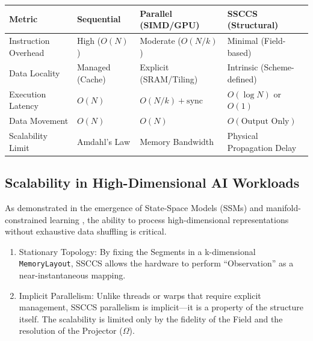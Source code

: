 \documentclass[
  a4paper,
  DIV=11,
  numbers=noendperiod]{scrartcl}
\providecommand{\tightlist}{%
  \setlength{\itemsep}{0pt}\setlength{\parskip}{0pt}}
\begin{document}
\begin{longtable}[]{@{}
  >{\raggedright\arraybackslash}p{}
  >{\raggedright\arraybackslash}p{}
  >{\raggedright\arraybackslash}p{}
  >{\raggedright\arraybackslash}p{}@{}}
\toprule\noalign{}
\begin{minipage}[b]{\linewidth}\raggedright
Metric
\end{minipage} & \begin{minipage}[b]{\linewidth}\raggedright
Sequential
\end{minipage} & \begin{minipage}[b]{\linewidth}\raggedright
Parallel (SIMD/GPU)
\end{minipage} & \begin{minipage}[b]{\linewidth}\raggedright
SSCCS (Structural)
\end{minipage} \\
\midrule\noalign{}
\endhead
\bottomrule\noalign{}
\endlastfoot
Instruction Overhead & High (\(O(N)\)) & Moderate (\(O(N/k)\)) & Minimal
(Field-based) \\
Data Locality & Managed (Cache) & Explicit (SRAM/Tiling) & Intrinsic
(Scheme-defined) \\
Execution Latency & \(O(N)\) & \(O(N/k) + \text{sync}\) & \(O(\log N)\)
or \(O(1)\) \\
Data Movement & \(O(N)\) & \(O(N)\) & \(O(\text{Output Only})\) \\
Scalability Limit & Amdahl's Law & Memory Bandwidth & Physical
Propagation Delay \\
\end{longtable}

\subsection{Scalability in High-Dimensional AI
Workloads}\label{scalability-in-high-dimensional-ai-workloads}

As demonstrated in the emergence of State-Space Models (SSMs)
 and manifold-constrained learning
, the ability to process
high-dimensional representations without exhaustive data shuffling is
critical.

\begin{enumerate}
\def\labelenumi{\arabic{enumi}.}
\tightlist
\item
  Stationary Topology: By fixing the Segments in a k-dimensional
  \texttt{MemoryLayout}, SSCCS allows the hardware to perform
  ``Observation'' as a near-instantaneous mapping.
\item
  Implicit Parallelism: Unlike threads or warps that require explicit
  management, SSCCS parallelism is implicit---it is a property of the
  structure itself. The scalability is limited only by the fidelity of
  the Field and the resolution of the Projector (\(\Omega\)).
\end{enumerate}
\end{document}

